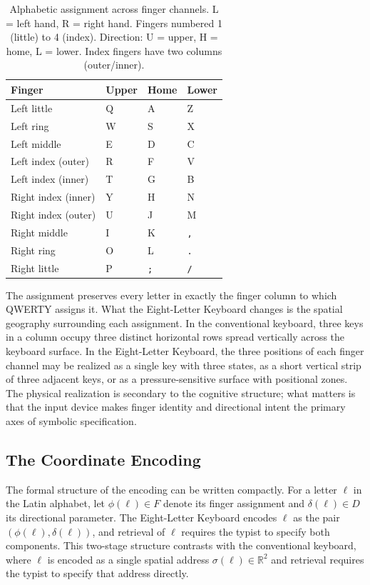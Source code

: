 \documentclass[12pt,a4paper]{article}
\theoremstyle{plain}
\theoremstyle{definition}
\theoremstyle{remark}
\begin{document}
\begin{table}[h]
\centering
\caption{Alphabetic assignment across finger channels. L = left hand,
R = right hand. Fingers numbered 1 (little) to 4 (index). Direction:
U = upper, H = home, L = lower. Index fingers have two columns (outer/inner).}
\smallskip
\begin{tabular}{llll}
\toprule
\textbf{Finger} & \textbf{Upper} & \textbf{Home} & \textbf{Lower} \\
\midrule
Left little        & Q & A & Z \\
Left ring          & W & S & X \\
Left middle        & E & D & C \\
Left index (outer) & R & F & V \\
Left index (inner) & T & G & B \\
Right index (inner)& Y & H & N \\
Right index (outer)& U & J & M \\
Right middle       & I & K & \texttt{,} \\
Right ring         & O & L & \texttt{.} \\
Right little       & P & \texttt{;} & \texttt{/} \\
\bottomrule
\end{tabular}
\end{table}

The assignment preserves every letter in exactly the finger column to which
QWERTY assigns it. What the Eight-Letter Keyboard changes is the spatial
geography surrounding each assignment. In the conventional keyboard, three
keys in a column occupy three distinct horizontal rows spread vertically across
the keyboard surface. In the Eight-Letter Keyboard, the three positions of each
finger channel may be realized as a single key with three states, as a short
vertical strip of three adjacent keys, or as a pressure-sensitive surface with
positional zones. The physical realization is secondary to the cognitive
structure; what matters is that the input device makes finger identity and
directional intent the primary axes of symbolic specification.

\subsection{The Coordinate Encoding}

The formal structure of the encoding can be written compactly. For a letter $\ell$
in the Latin alphabet, let $\phi(\ell) \in F$ denote its finger assignment and
$\delta(\ell) \in D$ its directional parameter. The Eight-Letter Keyboard
encodes $\ell$ as the pair $(\phi(\ell), \delta(\ell))$, and retrieval of $\ell$
requires the typist to specify both components. This two-stage structure contrasts
with the conventional keyboard, where $\ell$ is encoded as a single spatial
address $\sigma(\ell) \in \mathbb{R}^2$ and retrieval requires the typist to
specify that address directly.
\end{document}
